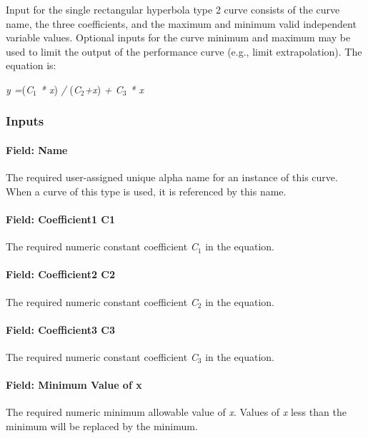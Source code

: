 Input for the single rectangular hyperbola type 2 curve consists of the curve name, the three coefficients, and the maximum and minimum valid independent variable values. Optional inputs for the curve minimum and maximum may be used to limit the output of the performance curve (e.g., limit extrapolation). The equation is:

\emph{y =}(\emph{C\(_{1}\) * x}) \emph{/} (\emph{C\(_{2}\)+x}) \emph{+ C\(_{3}\) * x}

\subsubsection{Inputs}\label{inputs-16-007}

\paragraph{Field: Name}\label{field-name-16-005}

The required user-assigned unique alpha name for an instance of this curve. When a curve of this type is used, it is referenced by this name.

\paragraph{Field: Coefficient1 C1}\label{field-coefficient1-c1-3}

The required numeric constant coefficient \emph{C\(_{1}\)} in the equation.

\paragraph{Field: Coefficient2 C2}\label{field-coefficient2-c2-3}

The required numeric constant coefficient \emph{C\(_{2}\)} in the equation.

\paragraph{Field: Coefficient3 C3}\label{field-coefficient3-c3-3}

The required numeric constant coefficient \emph{C\(_{3}\)} in the equation.

\paragraph{Field: Minimum Value of x}\label{field-minimum-value-of-x-15}

The required numeric minimum allowable value of \emph{x}. Values of \emph{x} less than the minimum will be replaced by the minimum.

